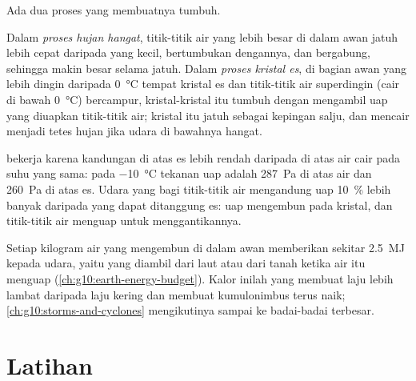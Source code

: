 Ada dua proses yang membuatnya tumbuh.

\begin{definition}\label{def:g10:why-clouds-form:rain-processes}
Dalam \emph{proses hujan hangat}, titik-titik air
yang lebih besar di dalam awan jatuh lebih cepat daripada yang kecil,
bertumbukan dengannya, dan bergabung, sehingga makin besar selama jatuh.
Dalam \emph{proses kristal es}, di bagian awan yang
lebih dingin daripada \qty{0}{\degreeCelsius} tempat kristal es dan
titik-titik air superdingin (cair di bawah \qty{0}{\degreeCelsius})
bercampur, kristal-kristal itu tumbuh dengan mengambil uap yang diuapkan
titik-titik air; kristal itu jatuh sebagai kepingan salju, dan mencair
menjadi tetes hujan jika udara di bawahnya hangat.
\end{definition}

 bekerja karena kandungan  di atas es lebih rendah
daripada di atas air cair pada suhu yang sama: pada
\qty{-10}{\degreeCelsius} tekanan uap  adalah \qty{287}{Pa} di atas air
dan \qty{260}{Pa} di atas es. Udara yang  bagi titik-titik air
mengandung uap \qty{10}{\percent} lebih banyak daripada yang dapat ditanggung
es: uap mengembun pada kristal, dan titik-titik air menguap untuk
menggantikannya.

\begin{remark}\label{rem:g10:why-clouds-form:latent}
Setiap kilogram air yang mengembun di dalam awan memberikan sekitar
\qty{2.5}{MJ} kepada udara, yaitu  yang diambil dari laut atau dari
tanah ketika air itu menguap (\cref{ch:g10:earth-energy-budget}). Kalor inilah
yang membuat laju  lebih lambat daripada laju kering dan membuat
kumulonimbus terus naik; \cref{ch:g10:storms-and-cyclones} mengikutinya sampai
ke badai-badai terbesar.
\end{remark}

\section{Latihan}

